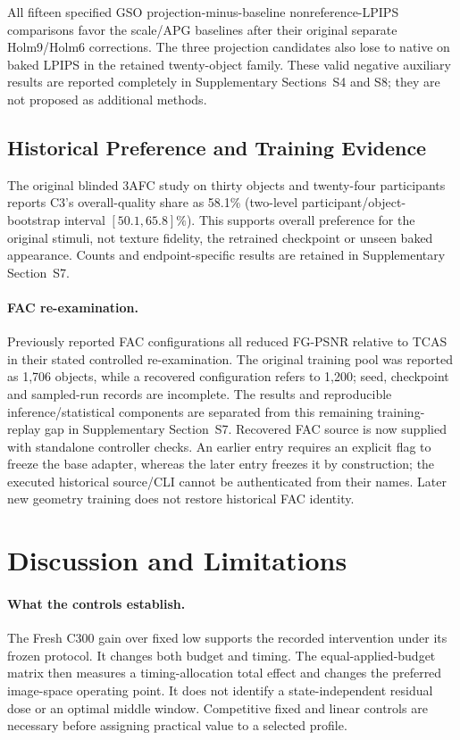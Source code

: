 \documentclass[times,twocolumn,final]{elsarticle}
\begin{document}
All fifteen specified GSO projection-minus-baseline nonreference-LPIPS comparisons favor the scale/APG baselines after their original separate Holm9/Holm6 corrections. The three projection candidates also lose to native on baked LPIPS in the retained twenty-object family. These valid negative auxiliary results are reported completely in Supplementary Sections~S4 and S8; they are not proposed as additional methods.

\subsection{Historical Preference and Training Evidence}
\label{subsec:preference}
The original blinded 3AFC study on thirty objects and twenty-four participants reports C3's overall-quality share as 58.1\% (two-level participant/object-bootstrap interval $[50.1,65.8]\%$). This supports overall preference for the original stimuli, not texture fidelity, the retrained checkpoint or unseen baked appearance. Counts and endpoint-specific results are retained in Supplementary Section~S7.

\paragraph{FAC re-examination.}
\label{subsec:facreported}
Previously reported FAC configurations all reduced FG-PSNR relative to TCAS in their stated controlled re-examination. The original training pool was reported as 1,706 objects, while a recovered configuration refers to 1,200; seed, checkpoint and sampled-run records are incomplete. The results and reproducible inference/statistical components are separated from this remaining training-replay gap in Supplementary Section~S7. Recovered FAC source is now supplied with standalone controller checks. An earlier entry requires an explicit flag to freeze the base adapter, whereas the later entry freezes it by construction; the executed historical source/CLI cannot be authenticated from their names. Later new geometry training does not restore historical FAC identity.


\FloatBarrier
\section{Discussion and Limitations}
\label{sec:limitations}

\paragraph{What the controls establish.}
The Fresh C300 gain over fixed low supports the recorded intervention under its frozen protocol. It changes both budget and timing. The equal-applied-budget matrix then measures a timing-allocation total effect and changes the preferred image-space operating point. It does not identify a state-independent residual dose or an optimal middle window. Competitive fixed and linear controls are necessary before assigning practical value to a selected profile.
\end{document}
